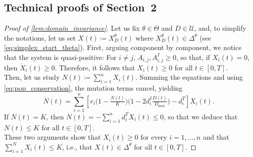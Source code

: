 \documentclass[a4paper,12pt, reqno]{amsart}
\theoremstyle{plain}
\theoremstyle{definition}
\theoremstyle{remark}
\numberwithin{equation}{section}
\newcommand{\U}{\mathcal{U}}
\begin{document}

\begin{appendix}
\section{Technical proofs of Section~2}
    \label{sec:appendix_theory}


{
\begin{proof}[Proof of \cref{lem:domain_invariance}]
Let us fix $\theta \in \Theta$ and $D\in \U$, and, to simplify the notations, let us set $X(t)\coloneqq X_D^\theta(t)$ where $X_D^\theta(t) \in \Delta^\theta$ (see \cref{eq:simplex_start_theta}).
First, arguing component by component, we notice that the system is quasi-positive: For $i\neq j$, $A_{i,j},A^I_{i,j}\geq 0$, so that, if $X_i(t)=0$, then $\dot X_i(t)\geq 0$. 
Therefore, it follows that $X_i(t)\geq 0$ for all $t\in[0,T]$.\\
Then, let us study $N(t)\coloneqq \sum_{i=1}^n X_i(t)$. Summing the equations and using \eqref{eq:pop_conservation}, the mutation terms cancel, yielding
\[
\dot N(t)
= \sum_{i=1}^n \left[ r_i\Big(1-\tfrac{N(t)}{K}\Big)\Big(1-2d_i^I\tfrac{D(t)}{D_{\max}}\Big) - d_i^T \right] X_i(t).
\]
If $N(t)=K$, then $\dot N(t) = -\sum_{i=1}^n d_i^T X_i(t)\leq 0$, so  that we deduce that $N(t)\leq K$ for all $t\in[0,T]$.\\
These two arguments show that $X_i(t)\geq 0$ for every $i=1,\ldots,n$ and that $\sum_{i=1}^NX_i(t)\leq K$, i.e., that $X(t)\in \Delta^\theta$ for all $t\in[0,T]$.
\end{proof}}




\end{appendix}
\end{document}
